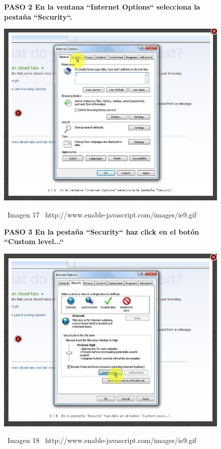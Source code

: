 \documentclass[11pt]{article} %
\begin{document}
\begin{figure}
\begin{center}


\begin{center}
\bf PASO 2
En la ventana ``Internet Options`` selecciona la pestaña ``Security``.


\includegraphics[height=8 cm, width=8 cm] {imagenes/explorer 02.jpg}
\end{center}

\ Imagen 17
\ {http://www.enable-javascript.com/images/ie9.gif }

\begin{center}
\bf PASO 3
En la pestaña ``Security`` haz click en el botón ``Custom level...``

\includegraphics[height=8 cm, width=8 cm] {imagenes/explorer 03.jpg}
\end{center}
\ Imagen 18 
\ {http://www.enable-javascript.com/images/ie9.gif }

\end{center}
\end{figure}
\end{document}
